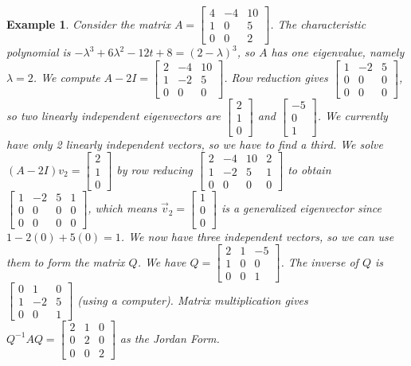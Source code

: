 \documentclass[10pt]{article}
\theoremstyle{plain}
\theoremstyle{box}
\newtheorem{example}{Example}
\begin{document}
\begin{example}
Consider the matrix 
$A=
\begin{bmatrix}
4&-4&10\\
1&0&5\\
0&0&2
\end{bmatrix}
$. The characteristic polynomial is $-\lambda^3+6\lambda^2-12 t+8 = (2-\lambda)^3$, so $A$ has one eigenvalue, namely $\lambda=2$.  We compute $A-2I = \begin{bmatrix} 2&-4&10\\1&-2&5
\\0&0&0\end{bmatrix} 
$.  Row reduction gives $\begin{bmatrix} 1&-2&5\\0&0&0
\\0&0&0\end{bmatrix} 
$, so two linearly independent eigenvectors are $\begin{bmatrix}2\\1\\0\end{bmatrix}$   and $\begin{bmatrix}-5\\0\\1\end{bmatrix}$.  We currently have only 2 linearly independent vectors, so we have to find a third.  We solve $(A-2I)v_2= \begin{bmatrix}2\\1\\0\end{bmatrix}$ by row reducing $ \begin{bmatrix} 2&-4&10&2\\1&-2&5&1
\\0&0&0&0\end{bmatrix} 
$ to obtain $\begin{bmatrix} 1&-2&5&1\\0&0&0&0
\\0&0&0&0\end{bmatrix}$, which means $\vec v_2=\begin{bmatrix}1\\0\\0\end{bmatrix}$ is a generalized eigenvector since $1-2(0)+5(0)=1$. We now have three independent vectors, so we can use them to form the matrix $Q$.
We have $Q= \begin{bmatrix} 2&1&-5\\1&0&0
\\0&0&1\end{bmatrix}$.  The inverse of $Q$ is 
$\begin{bmatrix} 0&1&0\\1&-2&5
\\0&0&1\end{bmatrix}
$ (using a computer). Matrix multiplication gives $Q^{-1}AQ = \begin{bmatrix} 2&1&0\\0&2&0
\\0&0&2\end{bmatrix}
$ as the Jordan Form.


\end{example}
\end{document}
